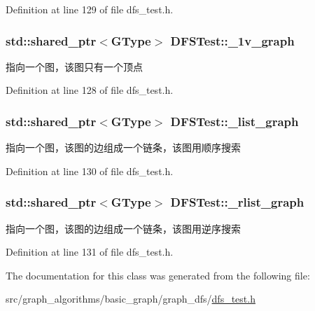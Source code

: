 Definition at line 129 of file dfs\+\_\+test.\+h.

\hypertarget{class_d_f_s_test_a4dbae7784992bee522457b53da2141c2}{}
\subsubsection[{\+\_\+1v\+\_\+graph}]{\setlength{\rightskip}{0pt plus 5cm}std\+::shared\+\_\+ptr$<${\bf G\+Type}$>$ D\+F\+S\+Test\+::\+\_\+1v\+\_\+graph\hspace{0.3cm}{\ttfamily [protected]}}\label{class_d_f_s_test_a4dbae7784992bee522457b53da2141c2}
指向一个图，该图只有一个顶点 

Definition at line 128 of file dfs\+\_\+test.\+h.

\hypertarget{class_d_f_s_test_a9607eac5350c4cdd449c353fed482efc}{}
\subsubsection[{\+\_\+list\+\_\+graph}]{\setlength{\rightskip}{0pt plus 5cm}std\+::shared\+\_\+ptr$<${\bf G\+Type}$>$ D\+F\+S\+Test\+::\+\_\+list\+\_\+graph\hspace{0.3cm}{\ttfamily [protected]}}\label{class_d_f_s_test_a9607eac5350c4cdd449c353fed482efc}
指向一个图，该图的边组成一个链条，该图用顺序搜索 

Definition at line 130 of file dfs\+\_\+test.\+h.

\hypertarget{class_d_f_s_test_a93a79d0654eb82517990c8f5419148a8}{}
\subsubsection[{\+\_\+rlist\+\_\+graph}]{\setlength{\rightskip}{0pt plus 5cm}std\+::shared\+\_\+ptr$<${\bf G\+Type}$>$ D\+F\+S\+Test\+::\+\_\+rlist\+\_\+graph\hspace{0.3cm}{\ttfamily [protected]}}\label{class_d_f_s_test_a93a79d0654eb82517990c8f5419148a8}
指向一个图，该图的边组成一个链条，该图用逆序搜索 

Definition at line 131 of file dfs\+\_\+test.\+h.



The documentation for this class was generated from the following file\+:\begin{DoxyCompactItemize}
\item 
src/graph\+\_\+algorithms/basic\+\_\+graph/graph\+\_\+dfs/\hyperlink{dfs__test_8h}{dfs\+\_\+test.\+h}\end{DoxyCompactItemize}
